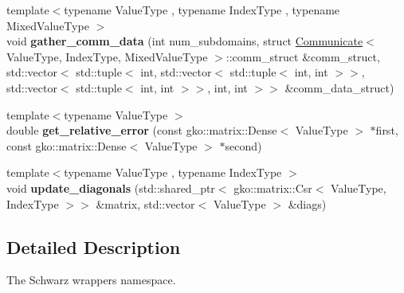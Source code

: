 \begin{DoxyCompactItemize}
\item 
\mbox{\label{namespaceschwz_a6e174da7b0a888de0b361c6ef27ae10a}} 
{\footnotesize template$<$typename Value\+Type , typename Index\+Type , typename Mixed\+Value\+Type $>$ }\\void {\bfseries gather\+\_\+comm\+\_\+data} (int num\+\_\+subdomains, struct \hyperlink{classschwz_1_1Communicate}{Communicate}$<$ Value\+Type, Index\+Type, Mixed\+Value\+Type $>$\+::comm\+\_\+struct \&comm\+\_\+struct, std\+::vector$<$ std\+::tuple$<$ int, std\+::vector$<$ std\+::tuple$<$ int, int $>$$>$, std\+::vector$<$ std\+::tuple$<$ int, int $>$$>$, int, int $>$$>$ \&comm\+\_\+data\+\_\+struct)
\item 
\mbox{\label{namespaceschwz_a326d36155d6eeccd87f66fdf5200df29}} 
{\footnotesize template$<$typename Value\+Type $>$ }\\double {\bfseries get\+\_\+relative\+\_\+error} (const gko\+::matrix\+::\+Dense$<$ Value\+Type $>$ $\ast$first, const gko\+::matrix\+::\+Dense$<$ Value\+Type $>$ $\ast$second)
\item 
\mbox{\label{namespaceschwz_aac5839ef31d9d40a6a9c80a8611b6e50}} 
{\footnotesize template$<$typename Value\+Type , typename Index\+Type $>$ }\\void {\bfseries update\+\_\+diagonals} (std\+::shared\+\_\+ptr$<$ gko\+::matrix\+::\+Csr$<$ Value\+Type, Index\+Type $>$$>$ \&matrix, std\+::vector$<$ Value\+Type $>$ \&diags)
\end{DoxyCompactItemize}


\subsection{Detailed Description}
The Schwarz wrappers namespace. 